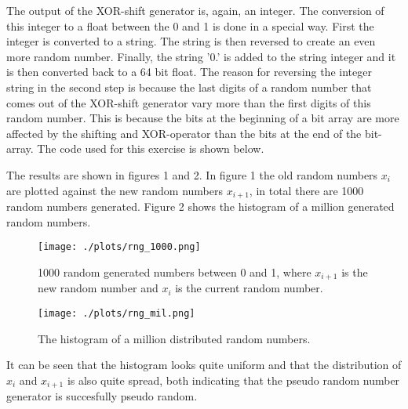 The output of the XOR-shift generator is, again, an integer. The conversion of this integer to a float between the 0 and 1 is done in a special way. First the integer is converted to a string. The string is then reversed to create an even more random number. Finally, the string '0.' is added to the string integer and it is then converted back to a 64 bit float. The reason for reversing the integer string in the second step is because the last digits of a random number that comes out of the XOR-shift generator vary more than the first digits of this random number. This is because the bits at the beginning of a bit array are more affected by the shifting and XOR-operator than the bits at the end of the bit-array. %
The code used for this exercise is shown below.



The results are shown in figures 1 and 2. In figure 1 the old random numbers $x_i$ are plotted against the new random numbers $x_{i+1}$, in total there are 1000 random numbers generated. Figure 2 shows the histogram of a million generated random numbers.
\\
\begin{figure}[h]
\centering
\texttt{[image: ./plots/rng\_1000.png]}
\caption{1000 random generated numbers between 0 and 1, where $x_{i+1}$ is the new random number and $x_i$ is the current random number.}
\label{rng_1000}
\end{figure}
\begin{figure}[h]
\centering
\texttt{[image: ./plots/rng\_mil.png]}
\label{hist_mil}
\caption{The histogram of a million distributed random numbers. }
\end{figure}

It can be seen that the histogram looks quite uniform and that the distribution of $x_i$ and $x_{i+1}$ is also quite spread, both indicating that the pseudo random number generator is succesfully pseudo random. 
\newpage